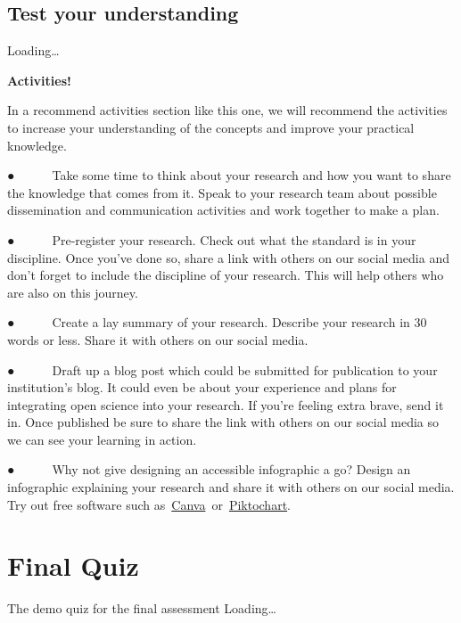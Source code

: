 \documentclass[
]{book}
\begin{document}
\hypertarget{test-your-understanding-8}{%
\section{Test your understanding}\label{test-your-understanding-8}}

Loading\ldots{}

\textbf{Activities!}

In a recommend activities section like this one, we will recommend the activities to increase your understanding of the concepts and improve your practical knowledge.

● ~ ~ ~~Take some time to think about your research and how you want to share the knowledge that comes from it. Speak to your research team about possible dissemination and communication activities and work together to make a plan.

● ~ ~ ~~Pre-register your research. Check out what the standard is in your discipline. Once you've done so, share a link with others on our social media and don't forget to include the discipline of your research. This will help others who are also on this journey.

● ~ ~ ~~Create a lay summary of your research. Describe your research in 30 words or less. Share it with others on our social media.

● ~ ~ ~~Draft up a blog post which could be submitted for publication to your institution's blog. It could even be about your experience and plans for integrating open science into your research. If you're feeling extra brave, send it in. Once published be sure to share the link with others on our social media so we can see your learning in action.

● ~ ~ ~~Why not give designing an accessible infographic a go? Design an infographic explaining your research and share it with others on our social media. Try out free software such as~\href{http://www.canva.com/}{Canva}~or~\href{https://piktochart.com/}{Piktochart}.

\hypertarget{final-quiz}{%
\chapter{Final Quiz}\label{final-quiz}}

The demo quiz for the final assessment
Loading\ldots{}

  
\end{document}
